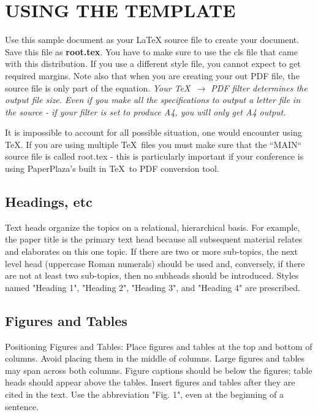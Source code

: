 \documentclass[letterpaper, 10 pt, conference]{ieeeconf}  %
\begin{document}
\section{USING THE TEMPLATE}

Use this sample document as your LaTeX source file to create your document. Save this file as {\bf root.tex}. You have to make sure to use the cls file that came with this distribution. If you use a different style file, you cannot expect to get required margins. Note also that when you are creating your out PDF file, the source file is only part of the equation. {\it Your \TeX\ $\rightarrow$ PDF filter determines the output file size. Even if you make all the specifications to output a letter file in the source - if your filter is set to produce A4, you will only get A4 output. }

It is impossible to account for all possible situation, one would encounter using \TeX. If you are using multiple \TeX\ files you must make sure that the ``MAIN`` source file is called root.tex - this is particularly important if your conference is using PaperPlaza's built in \TeX\ to PDF conversion tool.

\subsection{Headings, etc}

Text heads organize the topics on a relational, hierarchical basis. For example, the paper title is the primary text head because all subsequent material relates and elaborates on this one topic. If there are two or more sub-topics, the next level head (uppercase Roman numerals) should be used and, conversely, if there are not at least two sub-topics, then no subheads should be introduced. Styles named "Heading 1", "Heading 2", "Heading 3", and "Heading 4" are prescribed.

\subsection{Figures and Tables}

Positioning Figures and Tables: Place figures and tables at the top and bottom of columns. Avoid placing them in the middle of columns. Large figures and tables may span across both columns. Figure captions should be below the figures; table heads should appear above the tables. Insert figures and tables after they are cited in the text. Use the abbreviation "Fig. 1", even at the beginning of a sentence.
\end{document}
